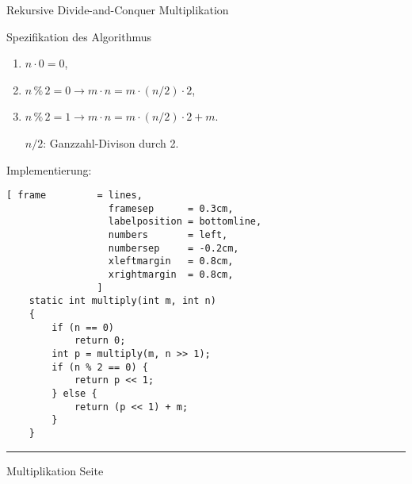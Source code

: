 \documentclass{slides}
\newcounter{mypage}
\begin{document}
\begin{slide}{}
\begin{center}
Rekursive Divide-and-Conquer Multiplikation  
\end{center}

\footnotesize
Spezifikation des Algorithmus
\begin{enumerate}
\item $n \cdot 0 = 0$,
\item $n \,\%\, 2 = 0 \rightarrow m \cdot n = m \cdot (n/2) \cdot 2$,
\item $n \,\%\, 2 = 1 \rightarrow m \cdot n = m \cdot (n/2) \cdot 2 + m$.

      $n/2$: Ganzzahl-Divison durch 2.
\end{enumerate}

Implementierung:
\begin{Verbatim}[ frame         = lines, 
                  framesep      = 0.3cm, 
                  labelposition = bottomline,
                  numbers       = left,
                  numbersep     = -0.2cm,
                  xleftmargin   = 0.8cm,
                  xrightmargin  = 0.8cm,
                ]
    static int multiply(int m, int n)
    {
        if (n == 0)
            return 0;
        int p = multiply(m, n >> 1);
        if (n % 2 == 0) {
            return p << 1;
        } else {
            return (p << 1) + m;
        }
    }
\end{Verbatim}



\vspace*{\fill}
\tiny \addtocounter{mypage}{1}
\rule{17cm}{1mm}
Multiplikation  \hspace*{\fill} Seite 
\end{slide}


\end{document}
